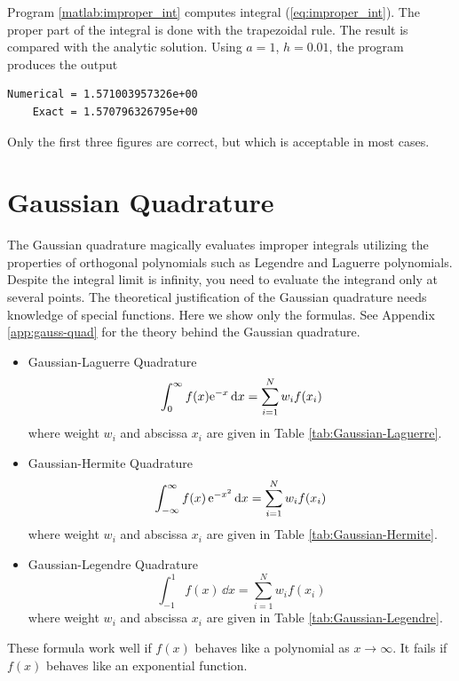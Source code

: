 \begin{example}
Program \ref{matlab:improper_int} computes integral (\ref{eq:improper_int}).  The proper part of the integral is done with the trapezoidal rule.  The result is compared with the analytic solution.  Using $a=1$, $h=0.01$, the program produces the output

\begin{mybox}
\small
\begin{verbatim}
Numerical = 1.571003957326e+00
    Exact = 1.570796326795e+00
\end{verbatim}
\normalsize
\end{mybox}

\bigskip\noindent
Only the first three figures are correct, but which is acceptable in most cases.
\end{example}

\noindent
\section{Gaussian Quadrature}\label{sec:Gaussian_Quadrature}

The Gaussian quadrature magically evaluates improper integrals utilizing the properties of orthogonal polynomials such as Legendre and Laguerre polynomials.  Despite the integral limit is infinity, you need to evaluate the integrand only at several points.  The theoretical justification of the Gaussian quadrature needs knowledge of special functions. Here we show only the formulas. See Appendix \ref{app:gauss-quad} for the theory behind the Gaussian quadrature.  

\begin{itemize}
\item Gaussian-Laguerre Quadrature
\begin{equation}\label{eq:gauss-laguerre}
\int_0^\infty f(x) \text{e}^{-x} \dd{x} = \sum_{i=1}^{N} w_i f(x_i)
\end{equation}
where weight $w_i$ and abscissa $x_i$ are given in Table \ref{tab:Gaussian-Laguerre}.

\item Gaussian-Hermite Quadrature
\begin{equation}\label{gauss-hermite}
\int_{-\infty}^\infty f(x)\, \text{e}^{-x^2} \dd{x} = \sum_{i=1}^{N} w_i f(x_i)
\end{equation}
where weight $w_i$ and abscissa $x_i$ are given in Table \ref{tab:Gaussian-Hermite}. 

\item Gaussian-Legendre Quadrature
\begin{equation}\label{gauss-legendre}
\int_{-1}^1 f(x) \, \dd{x} = \sum_{i=1}^{N} w_i f(x_i)
\end{equation}
where weight $w_i$ and abscissa $x_i$ are given in Table \ref{tab:Gaussian-Legendre}. 

\end{itemize}
These formula work well if $f(x)$ behaves like a polynomial as $x \rightarrow \infty$. It fails if $f(x)$ behaves like an exponential function.  

